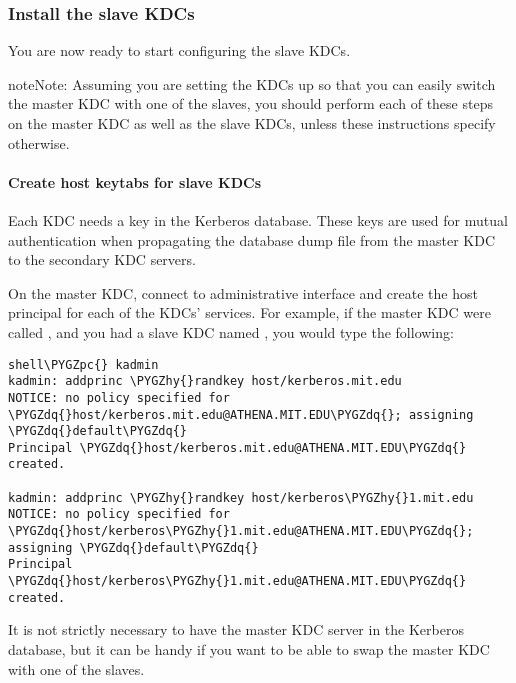 \documentclass[letterpaper,10pt,english]{sphinxmanual}
\def\PYGZpc{\char`\%}
\def\PYGZhy{\char`\-}
\def\PYGZdq{\char`\"}
\begin{document}
\subsubsection{Install the slave KDCs}
\label{admin/install_kdc:install-the-slave-kdcs}
You are now ready to start configuring the slave KDCs.

\begin{notice}{note}{Note:}
Assuming you are setting the KDCs up so that you can easily
switch the master KDC with one of the slaves, you should
perform each of these steps on the master KDC as well as the
slave KDCs, unless these instructions specify otherwise.
\end{notice}


\paragraph{Create host keytabs for slave KDCs}
\label{admin/install_kdc:slave-host-key}\label{admin/install_kdc:create-host-keytabs-for-slave-kdcs}
Each KDC needs a  key in the Kerberos database.  These keys
are used for mutual authentication when propagating the database dump
file from the master KDC to the secondary KDC servers.

On the master KDC, connect to administrative interface and create the
host principal for each of the KDCs'  services.  For example,
if the master KDC were called , and you had a
slave KDC named , you would type the following:

\begin{Verbatim}[commandchars=\\\{\}]
shell\PYGZpc{} kadmin
kadmin: addprinc \PYGZhy{}randkey host/kerberos.mit.edu
NOTICE: no policy specified for \PYGZdq{}host/kerberos.mit.edu@ATHENA.MIT.EDU\PYGZdq{}; assigning \PYGZdq{}default\PYGZdq{}
Principal \PYGZdq{}host/kerberos.mit.edu@ATHENA.MIT.EDU\PYGZdq{} created.

kadmin: addprinc \PYGZhy{}randkey host/kerberos\PYGZhy{}1.mit.edu
NOTICE: no policy specified for \PYGZdq{}host/kerberos\PYGZhy{}1.mit.edu@ATHENA.MIT.EDU\PYGZdq{}; assigning \PYGZdq{}default\PYGZdq{}
Principal \PYGZdq{}host/kerberos\PYGZhy{}1.mit.edu@ATHENA.MIT.EDU\PYGZdq{} created.
\end{Verbatim}

It is not strictly necessary to have the master KDC server in the
Kerberos database, but it can be handy if you want to be able to swap
the master KDC with one of the slaves.
\end{document}
